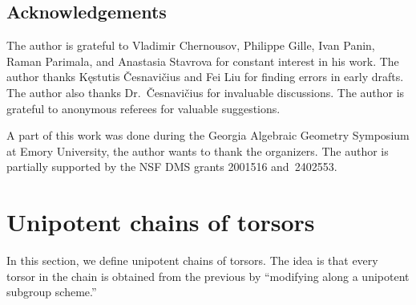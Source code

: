 \documentclass[11pt]{amsart}
\theoremstyle{plain}
\theoremstyle{definition}
\theoremstyle{remark}
\begin{document}
\subsection{Acknowledgements} The author is grateful to Vladimir Chernousov, Philippe Gille, Ivan Panin, Raman Parimala, and Anastasia Stavrova for constant interest in his work. The author thanks K\k{e}stutis \v{C}esnavi\v{c}ius and Fei Liu for finding errors in early drafts. The author also thanks Dr.~\v{C}esnavi\v{c}ius for invaluable discussions. The author is grateful to anonymous referees for valuable suggestions.

A part of this work was done during the Georgia Algebraic Geometry Symposium at Emory University, the author wants to thank the organizers. The author is partially supported by the NSF DMS grants 2001516 and~2402553.

\section{Unipotent chains of torsors}\label{sect:Chains}
In this section, we define unipotent chains of torsors. The idea is that every torsor in the chain is obtained from the previous by ``modifying along a unipotent subgroup scheme.''
\end{document}
